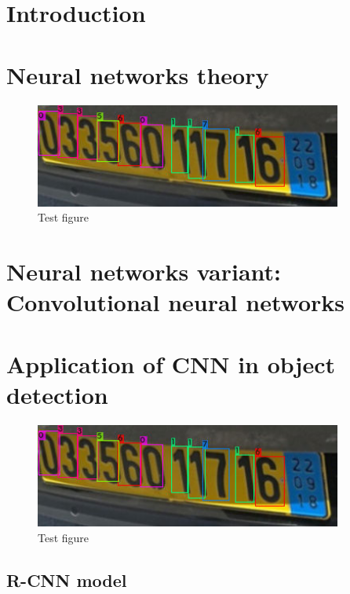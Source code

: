 \chapter*{Introduction}
\blindtext[5]

\chapter{Neural networks theory}
\blindtext \cite{AN19}

\begin{figure}[!htbp]
  \centering
  \includegraphics[width=0.9\textwidth]{predictions}
  \caption{Test figure}
\end{figure}


\blindtext

\chapter[Convolutional neural networks]{Neural networks variant: Convolutional neural networks}
\chapter{Application of CNN in object detection}

\blindtext \cite{AN19}

\begin{figure}[!htbp]
  \centering
  \includegraphics[width=0.9\textwidth]{predictions}
  \caption{Test figure}
\end{figure}


\blindtext

\section{R-CNN model}
